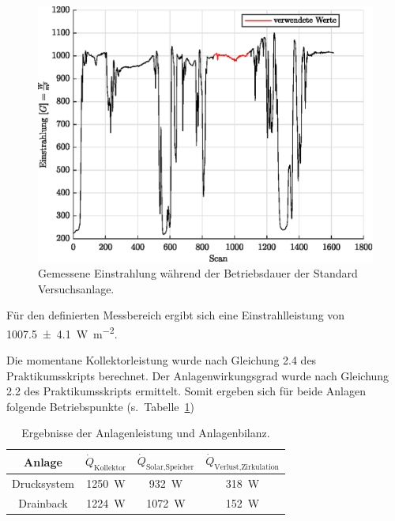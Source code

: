 \begin{figure}[H]
	\centering
	\includegraphics[height=0.3\textheight]{../DATA/DataEinstrahlung.eps}
	\caption[Gemessene Einstrahlung während der Betriebsdauer der Standard Versuchsanlage]{Gemessene Einstrahlung während der Betriebsdauer der Standard Versuchsanlage.}
	\label{fig:Einstrahlung}
\end{figure}

Für den definierten Messbereich ergibt sich eine Einstrahlleistung von \SI{1007.5(41)}{\watt\per\meter\squared}.
 
Die momentane Kollektorleistung wurde nach Gleichung 2.4 des Praktikumsskripts berechnet. Der Anlagenwirkungsgrad wurde nach Gleichung 2.2 des Praktikumsskripts ermittelt. Somit ergeben sich für beide Anlagen folgende Betriebspunkte (s.~Tabelle~\ref{tab:BetPoints})

\begin{table}[H]
	\centering
	\caption{Ergebnisse der Anlagenleistung und Anlagenbilanz.}
	\label{tab:BetPoints}
	\begin{tabular}{cccc}
		\toprule
		Anlage	& $\dot{Q}_{\text{Kollektor}}$ &  $\dot{Q}_{\text{Solar,Speicher}}$  & $\dot{Q}_{\text{Verlust,Zirkulation}}$     \\
		\midrule
		Drucksystem & \SI{1250}{\watt} & \SI{932}{\watt} &  \SI{318}{\watt}\\
		Drainback & \SI{1224}{\watt} & \SI{1072}{\watt} &  \SI{152}{\watt}\\
		\bottomrule
	\end{tabular}
\end{table}


